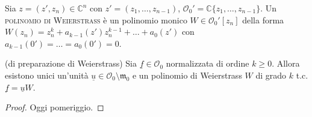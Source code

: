 \begin{defn}
  Sia $z=(z',z_n) \in \mathbb{C}^n$ con $z'=(z_1,\dots,z_{n-1})$, $\mathcal{O}_0'=\mathbb{C}\{z_1,\dots,z_{n-1}\}$. Un \textsc{polinomio di Weierstrass} è un polinomio monico $W \in \mathcal{O}_0'[z_n]$ della forma $W(z_n)=z_n^k+a_{k-1}(z')z_n^{k-1}+\dots+a_0(z')$ con $a_{k-1}(0')=\dots=a_0(0')=0$.
\end{defn}

\begin{thm}
  (di preparazione di Weierstrass) Sia $\underline{f} \in \mathcal{O}_0$ normalizzata di ordine $k \ge 0$. Allora esistono unici un'unità $\underline{u} \in \mathcal{O}_0\setminus\mathfrak{m}_0$ e un polinomio di Weierstrass $W$ di grado $k$ t.c. $\underline{f}=\underline{u}W$.
\end{thm}

\begin{proof}
  Oggi pomeriggio.
\end{proof}
